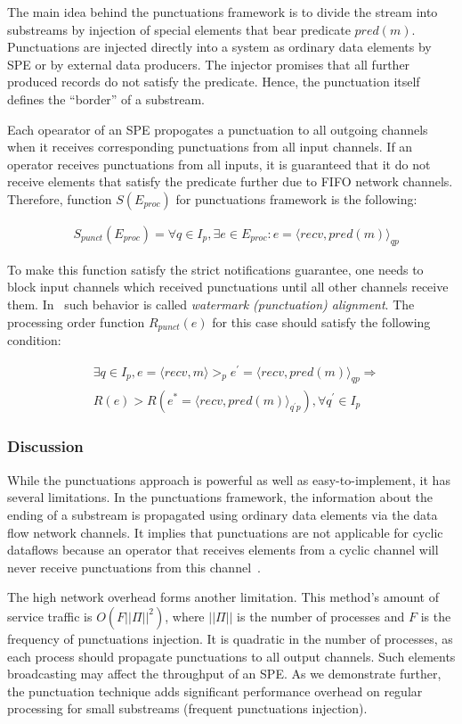 The main idea behind the punctuations framework is to divide the stream into substreams by injection of special elements that bear predicate $pred(m)$. Punctuations are injected directly into a system as ordinary data elements by SPE or by external data producers. The injector promises that all further produced records do not satisfy the predicate. Hence, the punctuation itself defines the ``border'' of a substream.

Each opearator of an SPE propogates a punctuation to all outgoing channels when it receives corresponding punctuations from all input channels. If an operator receives punctuations from all inputs, it is guaranteed that it do not receive elements that satisfy the predicate further due to FIFO network channels. Therefore, function $S(E_{proc})$ for punctuations framework is the following:

\begin{align*}
& S_{punct}(E_{proc}) = \forall q \in I_p, \exists e \in E_{proc} : e = \langle recv,pred(m)\rangle_{qp}
\end{align*}

To make this function satisfy the strict notifications guarantee, one needs to block input channels which received punctuations until all other channels receive them. In~\cite{Carbone:2017:SMA:3137765.3137777} such behavior is called {\em watermark (punctuation) alignment}. The processing order function $R_{punct}(e)$ for this case should satisfy the following condition:

\begin{align*}
& \exists q \in I_p, e = \langle recv,m \rangle >_p e^{'} = \langle recv,pred(m)\rangle_{qp} \Longrightarrow \\ 
& R(e) > R(e^{*}= \langle recv,pred(m) \rangle_{q^{'}p}), \forall q^{'} \in I_p
\end{align*}

\subsubsection{Discussion}

While the punctuations approach is powerful as well as easy-to-implement, it has several limitations. In the punctuations framework, the information about the ending of a substream is propagated using ordinary data elements via the data flow network channels. It implies that punctuations are not applicable for cyclic dataflows because an operator that receives elements from a cyclic channel will never receive punctuations from this channel~\cite{carbone2018scalable}.

The high network overhead forms another limitation. This method's amount of service traffic is $O(F||\Pi||^2)$, where $||\Pi||$ is the number of processes and $F$ is the frequency of punctuations injection. It is quadratic in the number of processes, as each process should propagate punctuations to all output channels. Such elements broadcasting may affect the throughput of an SPE. As we demonstrate further, the punctuation technique adds significant performance overhead on regular processing for small substreams (frequent punctuations injection).